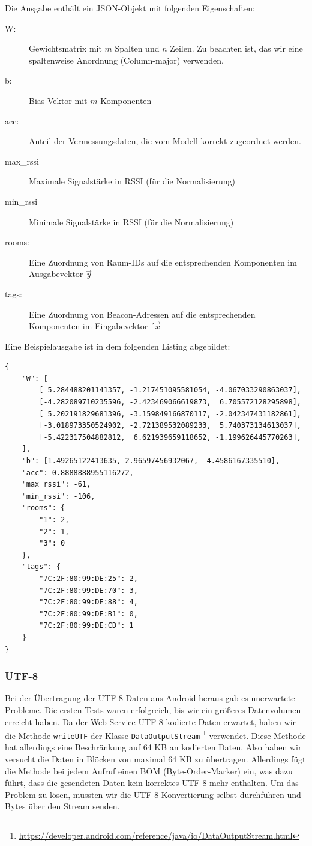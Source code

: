Die Ausgabe enthält ein JSON-Objekt mit folgenden Eigenschaften:
\begin{description}
	\item[W:] Gewichtsmatrix mit $m$ Spalten und $n$ Zeilen. Zu beachten ist, das wir eine
		spaltenweise Anordnung (Column-major) verwenden.
	\item[b:] Bias-Vektor mit $m$ Komponenten
	\item[acc:] Anteil der Vermessungsdaten, die vom Modell korrekt zugeordnet werden.
	\item[max\_rssi] Maximale Signalstärke in RSSI (für die Normalisierung)
	\item[min\_rssi] Minimale Signalstärke in RSSI (für die Normalisierung)
	\item[rooms:] Eine Zuordnung von Raum-IDs auf die entsprechenden Komponenten im
		Ausgabevektor $\vec{y}$
	\item[tags:] Eine Zuordnung von Beacon-Adressen auf die entsprechenden Komponenten
		im Eingabevektor $´\vec{x}$
\end{description}

Eine Beispielausgabe ist in dem folgenden Listing abgebildet:
\begin{lstlisting}
{
	"W": [
		[ 5.284488201141357, -1.217451095581054, -4.067033290863037],
		[-4.282089710235596, -2.423469066619873,  6.705572128295898],
		[ 5.202191829681396, -3.159849166870117, -2.042347431182861],
		[-3.018973350524902, -2.721389532089233,  5.740373134613037],
		[-5.422317504882812,  6.621939659118652, -1.199626445770263],
	],
	"b": [1.49265122413635, 2.96597456932067, -4.4586167335510],
	"acc": 0.8888888955116272,
	"max_rssi": -61,
	"min_rssi": -106,
	"rooms": {
		"1": 2,
		"2": 1,
		"3": 0
	},
	"tags": {
		"7C:2F:80:99:DE:25": 2,
		"7C:2F:80:99:DE:70": 3,
		"7C:2F:80:99:DE:88": 4,
		"7C:2F:80:99:DE:B1": 0,
		"7C:2F:80:99:DE:CD": 1
	}
}
\end{lstlisting}

\subsubsection{UTF-8}
Bei der Übertragung der UTF-8 Daten aus Android heraus gab es unerwartete Probleme.
Die ersten Tests waren erfolgreich, bis wir ein größeres Datenvolumen erreicht haben.
Da der Web-Service UTF-8 kodierte Daten erwartet, haben wir die Methode \texttt{writeUTF}
der Klasse \texttt{DataOutputStream}
\footnote{\url{https://developer.android.com/reference/java/io/DataOutputStream.html}} 
verwendet. Diese Methode hat allerdings eine Beschränkung auf 64 KB an kodierten Daten.
Also haben wir versucht die Daten in Blöcken von maximal 64 KB zu übertragen. Allerdings
fügt die Methode bei jedem Aufruf einen BOM (Byte-Order-Marker) ein, was dazu führt,
dass die gesendeten Daten kein korrektes UTF-8 mehr enthalten.
Um das Problem zu lösen, mussten wir die UTF-8-Konvertierung selbst durchführen
und Bytes über den Stream senden.

